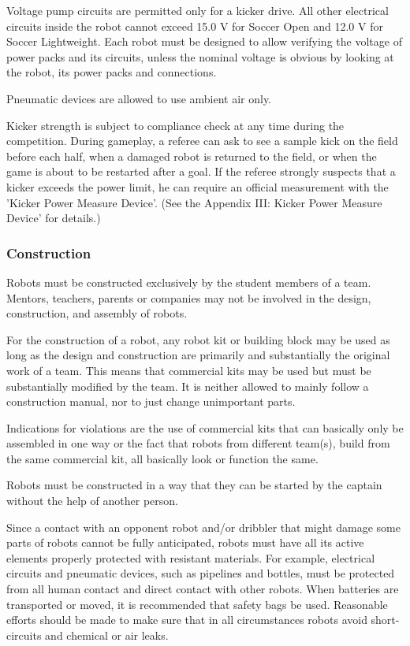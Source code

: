 \documentclass{article}
\begin{document}
Voltage pump circuits are permitted only for a kicker drive. All other
electrical circuits inside the robot cannot exceed 15.0 V for Soccer Open and
12.0 V for Soccer Lightweight. Each robot must be designed to allow verifying
the voltage of power packs and its circuits, unless the nominal voltage is
obvious by looking at the robot, its power packs and connections.

Pneumatic devices are allowed to use ambient air only.

Kicker strength is subject to compliance check at any time during the
competition. During gameplay, a referee can ask to see a sample kick on the
field before each half, when a damaged robot is returned to the field, or when
the game is about to be restarted after a goal. If the referee strongly
suspects that a kicker exceeds the power limit, he can require an official
measurement with the 'Kicker Power Measure Device'. (See the Appendix III:
Kicker Power Measure Device' for details.)

\subsubsection{Construction \label{ref-057}}

Robots must be constructed exclusively by the student members of a team.
Mentors, teachers, parents or companies may not be involved in the design,
construction, and assembly of robots.

For the construction of a robot, any robot kit or building block may be used as
long as the design and construction are primarily and substantially the
original work of a team. This means that commercial kits may be used but must
be substantially modified by the team. It is neither allowed to mainly follow a
construction manual, nor to just change unimportant parts.

Indications for violations are the use of commercial kits that can basically
only be assembled in one way or the fact that robots from different team(s),
build from the same commercial kit, all basically look or function the same.

Robots must be constructed in a way that they can be started by the captain
without the help of another person.

Since a contact with an opponent robot and/or dribbler that might damage some
parts of robots cannot be fully anticipated, robots must have all its active
elements properly protected with resistant materials. For example, electrical
circuits and pneumatic devices, such as pipelines and bottles, must be
protected from all human contact and direct contact with other robots. When
batteries are transported or moved, it is recommended that safety bags be used.
Reasonable efforts should be made to make sure that in all circumstances robots
avoid short-circuits and chemical or air leaks.
\end{document}
